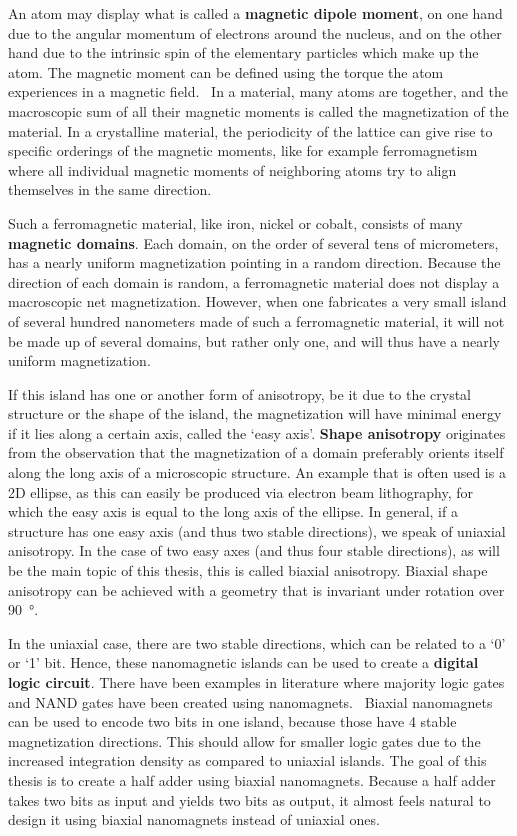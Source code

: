 \documentclass[10pt,a4paper]{article}
\begin{document}
\noindent An atom may display what is called a \textbf{magnetic dipole moment}, on one hand due to the angular momentum of electrons around the nucleus, and on the other hand due to the intrinsic spin of the elementary particles which make up the atom. The magnetic moment can be defined using the torque the atom experiences in a magnetic field.~\cite{IntroMagneticMaterials} In a material, many atoms are together, and the macroscopic sum of all their magnetic moments is called the magnetization of the material. In a crystalline material, the periodicity of the lattice can give rise to specific orderings of the magnetic moments, like for example ferromagnetism where all individual magnetic moments of neighboring atoms try to align themselves in the same direction. \par 
Such a ferromagnetic material, like iron, nickel or cobalt, consists of many \textbf{magnetic domains}. Each domain, on the order of several tens of micrometers, has a nearly uniform magnetization pointing in a random direction. Because the direction of each domain is random, a ferromagnetic material does not display a macroscopic net magnetization. However, when one fabricates a very small island of several hundred nanometers made of such a ferromagnetic material, it will not be made up of several domains, but rather only one, and will thus have a nearly uniform magnetization. \par
If this island has one or another form of anisotropy, be it due to the crystal structure or the shape of the island, the magnetization will have minimal energy if it lies along a certain axis, called the `easy axis'. \textbf{Shape anisotropy} originates from the observation that the magnetization of a domain preferably orients itself along the long axis of a microscopic structure. An example that is often used is a 2D ellipse, as this can easily be produced via electron beam lithography, for which the easy axis is equal to the long axis of the ellipse. In general, if a structure has one easy axis (and thus two stable directions), we speak of uniaxial anisotropy. In the case of two easy axes (and thus four stable directions), as will be the main topic of this thesis, this is called biaxial anisotropy. Biaxial shape anisotropy can be achieved with a geometry that is invariant under rotation over \SI{90}{\degree}. \par
In the uniaxial case, there are two stable directions, which can be related to a `0' or `1' bit. Hence, these nanomagnetic islands can be used to create a \textbf{digital logic circuit}. There have been examples in literature where majority logic gates and NAND gates have been created using nanomagnets.~\cite{GYP-18} Biaxial nanomagnets can be used to encode two bits in one island, because those have 4 stable magnetization directions. This should allow for smaller logic gates due to the increased integration density as compared to uniaxial islands. The goal of this thesis is to create a half adder using biaxial nanomagnets. Because a half adder takes two bits as input and yields two bits as output, it almost feels natural to design it using biaxial nanomagnets instead of uniaxial ones.
\end{document}
